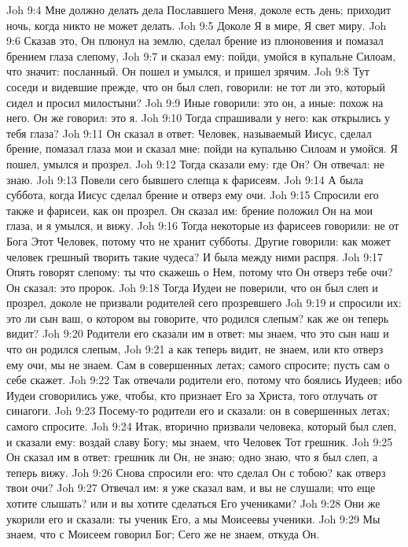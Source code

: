 Joh 9:4  Мне должно делать дела Пославшего Меня, доколе есть день; приходит ночь, когда никто не может делать.
Joh 9:5  Доколе Я в мире, Я свет миру.
Joh 9:6  Сказав это, Он плюнул на землю, сделал брение из плюновения и помазал брением глаза слепому,
Joh 9:7  и сказал ему: пойди, умойся в купальне Силоам, что значит: посланный. Он пошел и умылся, и пришел зрячим.
Joh 9:8  Тут соседи и видевшие прежде, что он был слеп, говорили: не тот ли это, который сидел и просил милостыни?
Joh 9:9  Иные говорили: это он, а иные: похож на него. Он же говорил: это я.
Joh 9:10  Тогда спрашивали у него: как открылись у тебя глаза?
Joh 9:11  Он сказал в ответ: Человек, называемый Иисус, сделал брение, помазал глаза мои и сказал мне: пойди на купальню Силоам и умойся. Я пошел, умылся и прозрел.
Joh 9:12  Тогда сказали ему: где Он? Он отвечал: не знаю.
Joh 9:13  Повели сего бывшего слепца к фарисеям.
Joh 9:14  А была суббота, когда Иисус сделал брение и отверз ему очи.
Joh 9:15  Спросили его также и фарисеи, как он прозрел. Он сказал им: брение положил Он на мои глаза, и я умылся, и вижу.
Joh 9:16  Тогда некоторые из фарисеев говорили: не от Бога Этот Человек, потому что не хранит субботы. Другие говорили: как может человек грешный творить такие чудеса? И была между ними распря.
Joh 9:17  Опять говорят слепому: ты что скажешь о Нем, потому что Он отверз тебе очи? Он сказал: это пророк.
Joh 9:18  Тогда Иудеи не поверили, что он был слеп и прозрел, доколе не призвали родителей сего прозревшего
Joh 9:19  и спросили их: это ли сын ваш, о котором вы говорите, что родился слепым? как же он теперь видит?
Joh 9:20  Родители его сказали им в ответ: мы знаем, что это сын наш и что он родился слепым,
Joh 9:21  а как теперь видит, не знаем, или кто отверз ему очи, мы не знаем. Сам в совершенных летах; самого спросите; пусть сам о себе скажет.
Joh 9:22  Так отвечали родители его, потому что боялись Иудеев; ибо Иудеи сговорились уже, чтобы, кто признает Его за Христа, того отлучать от синагоги.
Joh 9:23  Посему-то родители его и сказали: он в совершенных летах; самого спросите.
Joh 9:24  Итак, вторично призвали человека, который был слеп, и сказали ему: воздай славу Богу; мы знаем, что Человек Тот грешник.
Joh 9:25  Он сказал им в ответ: грешник ли Он, не знаю; одно знаю, что я был слеп, а теперь вижу.
Joh 9:26  Снова спросили его: что сделал Он с тобою? как отверз твои очи?
Joh 9:27  Отвечал им: я уже сказал вам, и вы не слушали; что еще хотите слышать? или и вы хотите сделаться Его учениками?
Joh 9:28  Они же укорили его и сказали: ты ученик Его, а мы Моисеевы ученики.
Joh 9:29  Мы знаем, что с Моисеем говорил Бог; Сего же не знаем, откуда Он.
